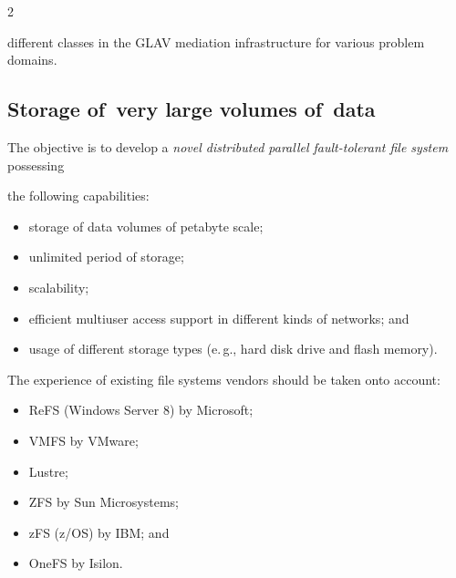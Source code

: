 \begin{multicols}{2}
\begin{enumerate}[1.]
different classes in the GLAV mediation infrastructure for various problem domains.

\end{enumerate}



\subsection{Storage of~very large volumes of~data}



\noindent

The objective is to develop a \textit{novel distributed parallel fault-tolerant file system} possessing 

the following capabilities:

\begin{itemize}

\item storage of data volumes of petabyte scale;

\item unlimited period of storage;

\item scalability;

\item efficient multiuser access support in different kinds of networks; and

\item usage of different storage types (e.\,g., hard disk drive and flash memory).

\end{itemize}



The experience of existing file systems vendors should be taken onto account:

\begin{itemize}

\item ReFS (Windows Server 8) by Microsoft;

\item VMFS by VMware;

\item Lustre;

\item ZFS by Sun Microsystems;

\item zFS (z/OS) by IBM; and

\item OneFS by Isilon.

\end{itemize}




\end{multicols}
